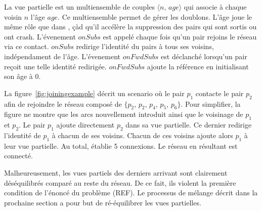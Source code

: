 \begin{figure*}
  \centering
  \hspace{8pt}
  \hspace{8pt}
  \caption{\label{fig:joiningexample}Example of the \SPRAY's joining
    protocol.}
\end{figure*}

\begin{algorithm}

\caption{\label{algo:joining}The joining protocol of \SPRAY.}
\end{algorithm}

La vue partielle est un multiensemble de couples $\langle n,\, age\rangle$ qui
associe à chaque voisin $n$ l'âge $age$. Ce multiensemble permet de gérer les
doublons. L'âge joue le même rôle que dans \CYCLON, çàd qu'il accélère la
suppression des pairs qui sont sortis ou ont crash. L'évenement $onSubs$ est
appelé chaque fois qu'un pair rejoins le réseau via ce contact. $onSubs$
redirige l'identité du pairs à tous ses voisins, indépendament de
l'âge. L'évenement $onFwdSubs$ est déclanché lorsqu'un pair reçoit une telle
identité redirigée. $onFwdSubs$ ajoute la référence en initialisant son âge à
$0$.

La figure~\ref{fig:joiningexample} décrit un scenario où le pair $p_1$ contacte
le pair $p_2$ afin de rejoindre le réseau composé de $\{p_2$, $p_2$, $p_4$,
$p_5$, $p_6\}$. Pour simplifier, la figure ne montre que les arcs nouvellement
introduit ainsi que le voisinage de $p_1$ et $p_2$. Le pair $p_1$ ajoute
directement $p_2$ dans sa vue partielle. Ce dernier redirige l'identité de $p_1$
à chacun de ses voisins.  Chacun de ces voisins ajoute alors $p_1$ à leur vue
partielle. Au total, \SPRAY établie 5 connexions. Le réseau en résultant est
connecté.

Malheureusement, les vues partiels des derniers arrivant sont clairement
déséquilibrés comparé au reste du réseau. De ce fait, ils violent la première
condition de l'énoncé du problème (REF). Le processus de mélange décrit dans la
prochaine section a pour but de ré-équilibrer les vues partielles.

